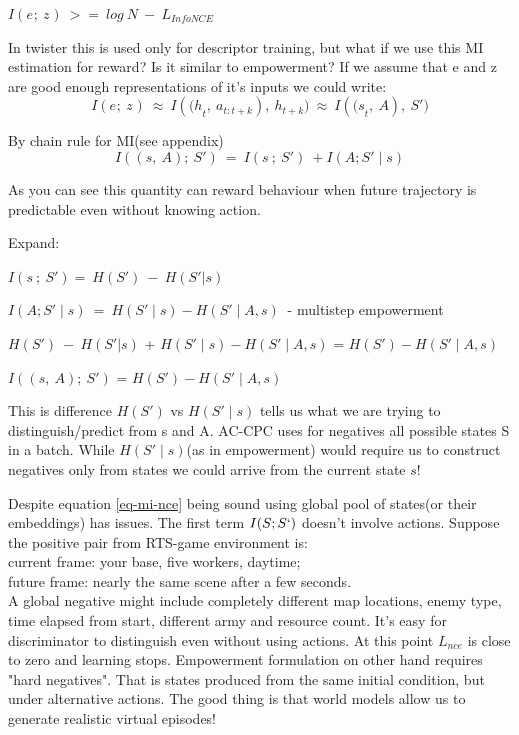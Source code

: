 $I(e_{};\ z_{})\  > = \ log\ N\  - \ L_{InfoNCE}$

In twister this is used only for descriptor training, but what if we use this MI estimation for reward? Is it similar to empowerment? If we assume that e and z are good enough representations of it's inputs we could write:
\begin{equation}
I(e_{};\ z_{})\  \approx \ I({(h}_{t},\ a_{t:t + k}),\ h_{t + k})\  \approx \ I({(s}_{t},\ A),\ S')
\end{equation}


By chain rule for MI(see appendix)
\begin{equation}
I((s,\ A);\ S')\  = \ I(s\ ;\ S')\  + I(A;S' \mid s)
\label{eq-mi-nce}
\end{equation}

As you can see this quantity can reward behaviour when future trajectory is predictable even without knowing action.

Expand:

$I(s\ ;\ S') = \ H(S')\  - \ H(S'|s)$

$I(A;S' \mid s)\  = \ H(S' \mid s) - H(S' \mid A,s)\ $ - multistep empowerment

$H(S')\  - \ H(S'|s)$ + $H(S' \mid s) - H(S' \mid A,s)$ = $H(S') - H(S' \mid A,s)$

$I((s,\ A);\ S')$ = $H(S') - H(S' \mid A,s)$

This is difference $H(S')$ vs $H(S' \mid s)$ tells us what we are trying to distinguish/predict from s and A. AC-CPC uses for negatives all possible states S in a batch. While $H(S' \mid s)$(as in empowerment) would require us to construct negatives only from states we could arrive from the current state $s$!

Despite equation \ref{eq-mi-nce} being sound using global pool of states(or their embeddings) has issues. The first term $I(S;S`)$ doesn't involve actions. Suppose the positive pair from RTS-game environment is:\\
current frame: your base, five workers, daytime; \\
future frame: nearly the same scene after a few seconds.\\
A global negative might include completely different map locations, enemy type, time elapsed from start, different army and resource count. It's easy for discriminator to distinguish even without using actions. At this point $L_{nce}$ is close to zero and learning stops.
Empowerment formulation on other hand requires "hard negatives". That is states produced from the same initial condition, but under alternative actions.
The good thing is that world models allow us to generate realistic virtual episodes!

